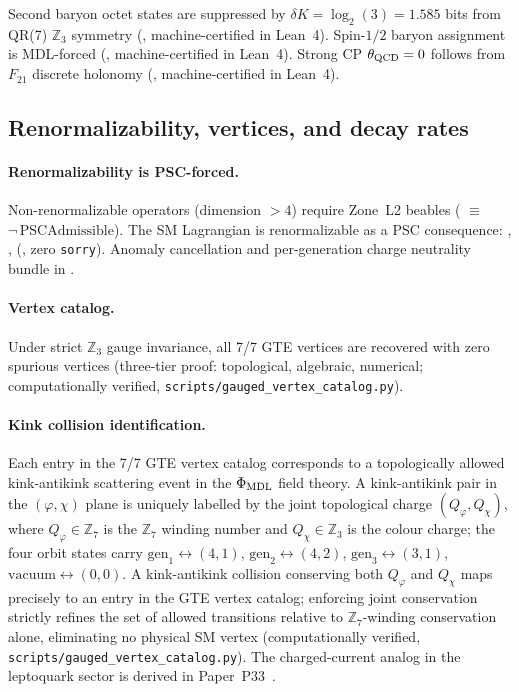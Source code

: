 Second baryon octet states are suppressed by $\delta K = \log_2(3) = 1.585$ bits from QR(7) $\mathbb{Z}_3$ symmetry (, machine-certified in Lean~4).
Spin-$1/2$ baryon assignment is MDL-forced (, machine-certified in Lean~4).
Strong CP $\theta_{\rm QCD} = 0$ follows from $F_{21}$ discrete holonomy (, machine-certified in Lean~4).

\subsection{Renormalizability, vertices, and decay rates}
\label{sec:renorm_vertices_decays}

\paragraph{Renormalizability is PSC-forced.}
Non-renormalizable operators (dimension $> 4$) require Zone~L2 beables ( $\equiv$ $\neg\,\mathrm{PSCAdmissible}$).
The SM Lagrangian is renormalizable as a PSC consequence:
, , 
(, zero \texttt{sorry}).
Anomaly cancellation and per-generation charge neutrality bundle in .

\paragraph{Vertex catalog.}
Under strict $\mathbb{Z}_3$ gauge invariance, all 7/7 GTE vertices are recovered with zero spurious vertices (three-tier proof: topological, algebraic, numerical; computationally verified, \texttt{scripts/gauged\_vertex\_catalog.py}).

\paragraph{Kink collision identification.}
Each entry in the 7/7 GTE vertex catalog corresponds to a topologically allowed kink-antikink scattering event in the $\Phi_{\rm MDL}$ field theory.
A kink-antikink pair in the $(\varphi, \chi)$ plane is uniquely labelled by the joint topological charge $(Q_\varphi, Q_\chi)$, where $Q_\varphi \in \mathbb{Z}_7$ is the $\mathbb{Z}_7$ winding number and $Q_\chi \in \mathbb{Z}_3$ is the colour charge; the four orbit states carry
$\mathrm{gen}_1 \leftrightarrow (4,1)$, $\mathrm{gen}_2 \leftrightarrow (4,2)$, $\mathrm{gen}_3 \leftrightarrow (3,1)$, $\mathrm{vacuum} \leftrightarrow (0,0)$.
A kink-antikink collision conserving both $Q_\varphi$ and $Q_\chi$ maps precisely to an entry in the GTE vertex catalog; enforcing joint conservation strictly refines the set of allowed transitions relative to $\mathbb{Z}_7$-winding conservation alone, eliminating no physical SM vertex (computationally verified, \texttt{scripts/gauged\_vertex\_catalog.py}).
The charged-current analog in the leptoquark sector is derived in Paper~P33~\cite{SpivackDeeperConsequences}.

